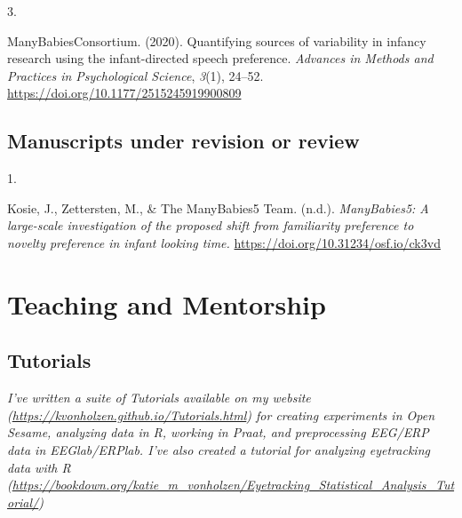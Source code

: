 \documentclass[10pt,a4paper,]{article}
\newlength{\cslhangindent}
\newlength{\csllabelwidth}
\newcommand{\CSLLeftMargin}[1]{\parbox[t]{\csllabelwidth}{\hfill #1~}}
\newcommand{\CSLRightInline}[1]{\parbox[t]{\linewidth - \cslhangindent - \csllabelwidth}{#1}\vspace{0.8ex}}
\begin{document}
\leavevmode{}%
\CSLLeftMargin{3. }%
\CSLRightInline{ManyBabiesConsortium. (2020). Quantifying sources of
variability in infancy research using the infant-directed speech
preference. \emph{Advances in Methods and Practices in Psychological
Science}, \emph{3}(1), 24--52.
\url{https://doi.org/10.1177/2515245919900809}}

\hypertarget{manuscripts-under-revision-or-review}{%
\subsection{Manuscripts under revision or
review}\label{manuscripts-under-revision-or-review}}

\hypertarget{bibliography}{}
\leavevmode{}%
\CSLLeftMargin{1. }%
\CSLRightInline{Kosie, J., Zettersten, M., \& The ManyBabies5 Team.
(n.d.). \emph{ManyBabies5: A large-scale investigation of the proposed
shift from familiarity preference to novelty preference in infant
looking time.} \url{https://doi.org/10.31234/osf.io/ck3vd}}

\hypertarget{teaching-and-mentorship}{%
\section{Teaching and Mentorship}\label{teaching-and-mentorship}}

\hypertarget{tutorials}{%
\subsection{Tutorials}\label{tutorials}}

\emph{I've written a suite of Tutorials available on my website
(\url{https://kvonholzen.github.io/Tutorials.html}) for creating
experiments in Open Sesame, analyzing data in R, working in Praat, and
preprocessing EEG/ERP data in EEGlab/ERPlab. I've also created a
tutorial for analyzing eyetracking data with R
(\url{https://bookdown.org/katie_m_vonholzen/Eyetracking_Statistical_Analysis_Tutorial/})}
\end{document}
